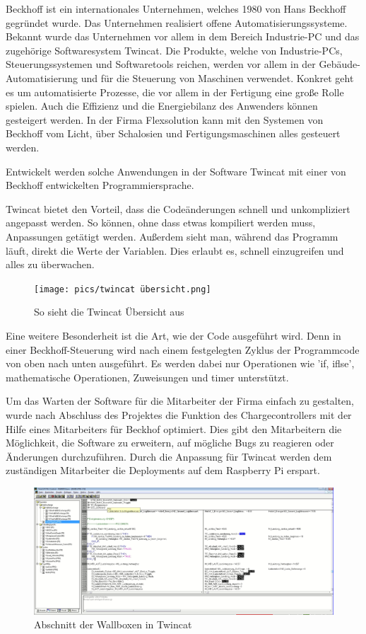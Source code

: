  

Beckhoff ist ein internationales Unternehmen, welches 1980 von Hans Beckhoff gegründet wurde. Das Unternehmen realisiert offene Automatisierungssysteme. Bekannt wurde das Unternehmen vor allem in dem Bereich Industrie-PC und das zugehörige Softwaresystem Twincat. Die Produkte, welche von Industrie-PCs, Steuerungssystemen und Softwaretools reichen, werden vor allem in der Gebäude-Automatisierung und für die Steuerung von Maschinen verwendet. Konkret geht es um automatisierte Prozesse, die vor allem in der Fertigung eine große Rolle spielen. Auch die Effizienz und die Energiebilanz des Anwenders können gesteigert werden. In der Firma Flexsolution kann mit den Systemen von Beckhoff vom Licht, über Schalosien und Fertigungsmaschinen alles gesteuert werden.   

Entwickelt werden solche Anwendungen in der Software Twincat mit einer von Beckhoff entwickelten Programmiersprache.   

  

Twincat bietet den Vorteil, dass die Codeänderungen schnell und unkompliziert angepasst werden. So können, ohne dass etwas kompiliert werden muss, Anpassungen getätigt werden. Außerdem sieht man, während das Programm läuft, direkt die Werte der Variablen. Dies erlaubt es, schnell einzugreifen und alles zu überwachen.

\begin{figure}[h t]
    \centering
    \texttt{[image: pics/twincat übersicht.png]}
    \caption{So sieht die Twincat Übersicht aus}
    \label{fig:impl:TwincatÜbersicht}
  \end{figure}

  Eine weitere Besonderheit ist die Art, wie der Code ausgeführt wird. Denn in einer Beckhoff-Steuerung wird nach einem festgelegten Zyklus der Programmcode von oben nach unten ausgeführt. Es werden dabei nur Operationen wie 'if, iflse', mathematische Operationen, Zuweisungen und timer unterstützt.   

Um das Warten der Software für die Mitarbeiter der Firma einfach zu gestalten, wurde nach Abschluss des Projektes die Funktion des Chargecontrollers mit der Hilfe eines Mitarbeiters für Beckhof optimiert. Dies gibt den Mitarbeitern die Möglichkeit, die Software zu erweitern, auf mögliche Bugs zu reagieren oder Änderungen durchzuführen. Durch die Anpassung für Twincat werden dem zuständigen Mitarbeiter die Deployments auf dem Raspberry Pi erspart.   

\begin{figure}[h t]
    \centering
    \includegraphics[scale=0.2]{pics/LadestationTwincat.png}
    \caption{Abschnitt der Wallboxen in Twincat}
    \label{fig:impl:TwincatWallbox}
  \end{figure}